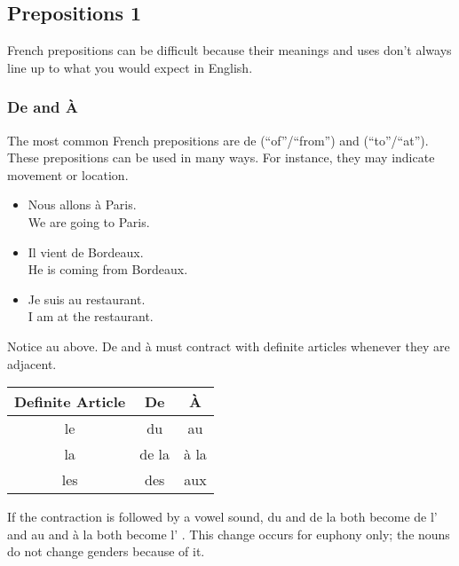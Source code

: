 \subsection{Prepositions 1}

French prepositions can be difficult because their meanings and uses don't always line up to what you would expect in English.

\subsubsection{De and {\`A}}

The most common French prepositions are \guillemotleft de \guillemotright (``of''/``from'') and  \guillemotright (``to''/``at''). These prepositions can be used in many ways. For instance, they may indicate movement or location.

\begin{itemize}
  \item  Nous allons {\`a} Paris. \\ We are going to Paris.
  \item  Il vient de Bordeaux. \\ He is coming from Bordeaux.
  \item  Je suis au restaurant. \\ I am at the restaurant.
\end{itemize}

Notice \guillemotleft au \guillemotright above. De and {\`a} must contract with definite articles whenever they are adjacent.

\begin{center}\begin{tabular}{|c|c|c|}
\hline
\textbf{Definite Article} & \textbf{De} & \textbf{{\`A}} \\ \hline
le                        & du          & au         \\ \hline
la                        & de la       & {\`a} la       \\ \hline
les                       & des         & aux        \\ \hline
\end{tabular}\end{center}

If the contraction is followed by a vowel sound, du and de la both become \guillemotleft de l' \guillemotright and au and {\`a} la both become  l' \guillemotright . This change occurs for euphony only; the nouns do not change genders because of it.


